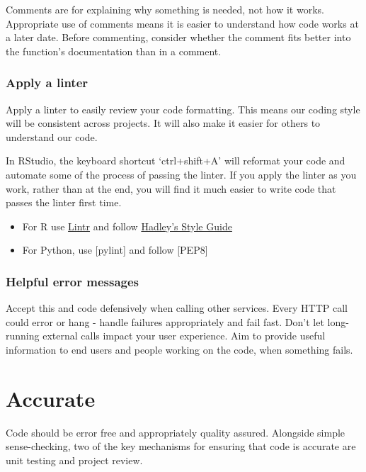 \documentclass[]{book}
\providecommand{\tightlist}{%
  \setlength{\itemsep}{0pt}\setlength{\parskip}{0pt}}
\begin{document}
Comments are for explaining why something is needed, not how it works. Appropriate use of comments means it is easier to understand how code works at a later date. Before commenting, consider whether the comment fits better into the function's documentation than in a comment.

\hypertarget{linter}{%
\subsubsection{Apply a linter}\label{linter}}

Apply a linter to easily review your code formatting. This means our coding style will be consistent across projects. It will also make it easier for others to understand our code.

In RStudio, the keyboard shortcut `ctrl+shift+A' will reformat your code and automate some of the process of passing the linter. If you apply the linter as you work, rather than at the end, you will find it much easier to write code that passes the linter first time.

\begin{itemize}
\tightlist
\item
  For R use \href{https://cran.r-project.org/web/packages/lintr/readme/README.html}{Lintr} and follow \href{http://adv-r.had.co.nz/Style.html}{Hadley's Style Guide}\\
\item
  For Python, use {[}pylint{]} and follow {[}PEP8{]}
\end{itemize}

\hypertarget{errors}{%
\subsubsection{Helpful error messages}\label{errors}}

Accept this and code defensively when calling other services.
Every HTTP call could error or hang - handle failures appropriately and fail fast. Don't let long-running external calls impact your user experience.
Aim to provide useful information to end users and people working on the code, when something fails.

\hypertarget{accurate}{%
\section{Accurate}\label{accurate}}

Code should be error free and appropriately quality assured. Alongside simple sense-checking, two of the key mechanisms for ensuring that code is accurate are unit testing and project review.
\end{document}
